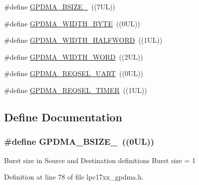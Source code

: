 \begin{DoxyCompactItemize}
\item 
\#define \hyperlink{group___g_p_d_m_a___public___macros_gad11cb83bebe2dc426f62cded244ea391}{\-G\-P\-D\-M\-A\-\_\-\-B\-S\-I\-Z\-E\-\_}~((7\-U\-L))
\item 
\#define \hyperlink{group___g_p_d_m_a___public___macros_gacc6deb5ab0e06eded3cdd151754db8f0}{\-G\-P\-D\-M\-A\-\_\-\-W\-I\-D\-T\-H\-\_\-\-B\-Y\-T\-E}~((0\-U\-L))
\item 
\#define \hyperlink{group___g_p_d_m_a___public___macros_gab28fc48561886a87a1c87eeb7078ef8b}{\-G\-P\-D\-M\-A\-\_\-\-W\-I\-D\-T\-H\-\_\-\-H\-A\-L\-F\-W\-O\-R\-D}~((1\-U\-L))
\item 
\#define \hyperlink{group___g_p_d_m_a___public___macros_gad611897f330a6ec01b0699b244b132bb}{\-G\-P\-D\-M\-A\-\_\-\-W\-I\-D\-T\-H\-\_\-\-W\-O\-R\-D}~((2\-U\-L))
\item 
\#define \hyperlink{group___g_p_d_m_a___public___macros_ga7780f362b7b5dadfcc67aa290ef0c736}{\-G\-P\-D\-M\-A\-\_\-\-R\-E\-Q\-S\-E\-L\-\_\-\-U\-A\-R\-T}~((0\-U\-L))
\item 
\#define \hyperlink{group___g_p_d_m_a___public___macros_ga60eb9a78fcea3de8824cb103628ca7ed}{\-G\-P\-D\-M\-A\-\_\-\-R\-E\-Q\-S\-E\-L\-\_\-\-T\-I\-M\-E\-R}~((1\-U\-L))
\end{DoxyCompactItemize}


\subsection{\-Define \-Documentation}
\hypertarget{group___g_p_d_m_a___public___macros_gafd44c148b998d28bc156b947794ad011}{
\subsubsection[{\-G\-P\-D\-M\-A\-\_\-\-B\-S\-I\-Z\-E\-\_\-1}]{\setlength{\rightskip}{0pt plus 5cm}\#define {\bf \-G\-P\-D\-M\-A\-\_\-\-B\-S\-I\-Z\-E\-\_}~((0\-U\-L))}}\label{group___g_p_d_m_a___public___macros_gafd44c148b998d28bc156b947794ad011}
\-Burst size in \-Source and \-Destination definitions \-Burst size = 1 

\-Definition at line 78 of file lpc17xx\-\_\-gpdma.\-h.

